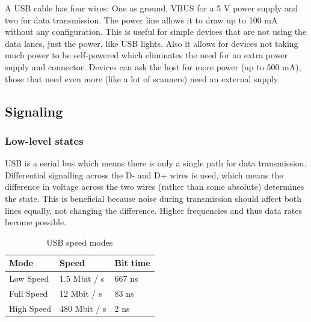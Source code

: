 \documentclass{article}
\begin{document}
A USB cable has four wires: One as ground, VBUS for a 5 V power supply and two for data transmission.
The power line allows it to draw up to 100 mA without any configuration. This is useful for simple
devices that are not using the data lanes, just the power, like USB lights. Also it allows for devices
not taking much power to be self-powered which eliminates the need for an extra power supply and connector.
Devices can ask the host for more power (up to 500 mA), those that need even more (like a lot of scanners) need
an external supply. \cite[p. 17f.]{usbstd}

\subsection{Signaling}

\subsubsection{Low-level states}

USB is a serial bus which means there is only a single path for data transmission.
Differential signalling across the D- and D+ wires is used, which means the difference in voltage
across the two wires (rather than some absolute) determines the state. This is beneficial because
noise during transmission should affect both lines equally, not changing the difference.
Higher frequencies and thus data rates become possible.

\begin{table}[!htbp]
  \caption{USB speed modes \cite[p. 159]{usbstd}}
  \centering
  \begin{tabular}{l | l | l}
    Mode & Speed & Bit time \\ \hline
    Low Speed & 1.5 Mbit / s & 667 ns \\
    Full Speed & 12 Mbit / s & 83 ns \\
    High Speed & 480 Mbit / s & 2 ns \\
  \end{tabular}
\end{table}
\end{document}
